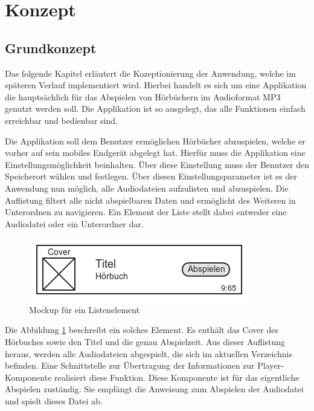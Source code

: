 \section{Konzept}

\subsection{Grundkonzept}

Das folgende Kapitel erläutert die Kozeptionierung der Anwendung, welche im späteren Verlauf implementiert wird. Hierbei handelt es sich um eine Applikation die hauptsächlich für das Abspielen von Hörbüchern im Audioformat MP3 genutzt werden soll. Die Applikation ist so ausgelegt, das alle Funktionen einfach erreichbar und bedienbar sind.

Die Applikation soll dem Benutzer ermöglichen Hörbücher abzuspielen, welche er vorher auf sein mobiles Endgerät abgelegt hat. Hierfür muss die Applikation eine Einstellungsmöglichkeit beinhalten. Über diese Einstellung muss der Benutzer den Speicherort wählen und festlegen. Über diesen Einstellungsparameter ist es der Anwendung nun möglich, alle Audiodateien aufzulisten und abzuspielen. Die Auflistung filtert alle nicht abspielbaren Daten und ermöglicht des Weiteren in Unterordnen zu navigieren. Ein Element der Liste stellt dabei entweder eine Audiodatei oder ein Unterordner dar. 

\begin{figure}[h!t]
\begin{center}
\includegraphics[scale=0.8]{images/listitem}
\caption{Mockup für ein Listenelement}
\label{mocklistel}
\end{center}
\end{figure}

Die Abbildung \ref{mocklistel} beschreibt ein solches Element. Es enthält das Cover des Hörbuches sowie den Titel und die genau Abspielzeit. Aus dieser Auflistung heraus, werden alle Audiodateien abgespielt, die sich im aktuellen Verzeichnis befinden. Eine Schnittstelle zur Übertragung der Informationen zur Player-Komponente realisiert diese Funktion. Diese Komponente ist für das eigentliche Abspielen zuständig. Sie empfängt die Anweisung zum Abspielen der Audiodatei und spielt dieses Datei ab.

